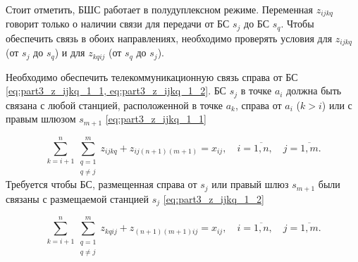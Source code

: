 


Стоит отметить, БШС работает в полудуплексном режиме. Переменная $z_{ijkq}$ говорит только о наличии связи для передачи от БС $s_j$ до БС $s_q$. Чтобы обеспечить связь в обоих направлениях, необходимо проверять условия для  $z_{ijkq}$ (от $s_j$ до $s_q$) и для $z_{kqij}$ (от $s_q$ до $s_j$).

Необходимо обеспечить телекоммуникационную связь справа от БС \cref{eq:part3_z_ijkq_1_1, eq:part3_z_ijkq_1_2}. БС $ s_j $ в точке $ a_i $ должна быть связана с  любой станцией, расположенной в точке $ a_k $, справа от $ a_i $ ($ k> i $) или с правым шлюзом $ s_{m + 1} $ \cref{eq:part3_z_ijkq_1_1} 

\begin{equation}
  \label{eq:part3_z_ijkq_1_1}
  \sum\limits_{k=i+1}^{n} \sum\limits_{\substack{q = 1\\ q \neq j}}^m z_{ijkq} + z_{ij(n+1)(m+1)} = x_{ij} ,  \quad i = \overline{1, n}, \quad j = \overline{1, m}.
\end{equation}
Требуется чтобы БС, размещенная справа от $s_j$ или правый шлюз $ s_{m + 1} $  были связаны с размещаемой станцией $ s_j $ \cref{eq:part3_z_ijkq_1_2}

\begin{equation}
  \label{eq:part3_z_ijkq_1_2}
  \sum\limits_{k=i+1}^{n} \sum\limits_{\substack{q = 1\\ q \neq j}}^m z_{kqij} + z_{(n+1)(m+1)ij} = x_{ij} ,  \quad i = \overline{1, n}, \quad j = \overline{1, m}.
\end{equation}

